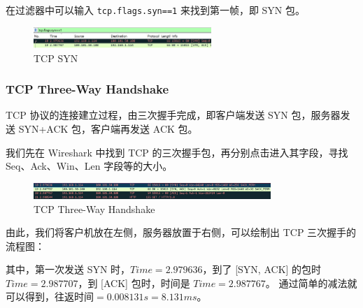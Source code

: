 \documentclass[14pt,a4paper,UTF8,twoside]{article}
\begin{document}
在过滤器中可以输入 \texttt{tcp.flags.syn==1} 来找到第一帧，即 SYN 包。

\begin{figure}[H]
	\centering
	\includegraphics[width=0.6\textwidth]{lab6/syn.png}
	\caption{TCP SYN}
\end{figure}

\subsubsection{TCP Three-Way Handshake}

TCP 协议的连接建立过程，由三次握手完成，即客户端发送 SYN 包，服务器发送 SYN+ACK 包，客户端再发送 ACK 包。

我们先在 Wireshark 中找到 TCP 的三次握手包，再分别点击进入其字段，寻找 Seq、Ack、Win、Len 字段等的大小。

\begin{figure}[H]
	\centering
	\includegraphics[width=0.8\textwidth]{lab6/three-way.png}
	\caption{TCP Three-Way Handshake}
\end{figure}

由此，我们将客户机放在左侧，服务器放置于右侧，可以绘制出 TCP 三次握手的流程图：

其中，第一次发送 SYN 时，$Time = 2.979636$，到了 [SYN, ACK] 的包时 $Time = 2.987707$，到 [ACK] 包时，时间是 $Time=2.987767$。
通过简单的减法就可以得到，$ \text{往返时间} = 0.008131s = 8.131ms $。
\end{document}
